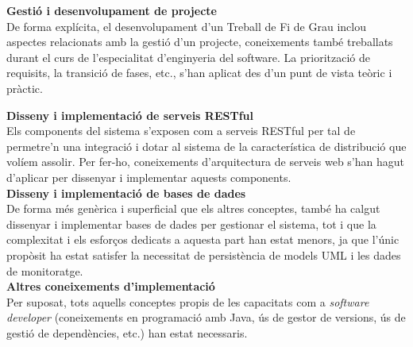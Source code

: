 
\textbf{Gestió i desenvolupament de projecte}\\

De forma explícita, el desenvolupament d'un Treball de Fi de Grau inclou aspectes relacionats amb la gestió d'un projecte, coneixements també treballats durant el curs de l'especialitat d'enginyeria del software. La priorització de requisits, la transició de fases, etc., s'han aplicat des d'un punt de vista teòric i pràctic.\\

\pagebreak

\textbf{Disseny i implementació de serveis RESTful}\\

Els components del sistema s'exposen com a serveis RESTful per tal de permetre'n una integració i dotar al sistema de la característica de distribució que volíem assolir. Per fer-ho, coneixements d'arquitectura de serveis web s'han hagut d'aplicar per dissenyar i implementar aquests components.\\

\textbf{Disseny i implementació de bases de dades}\\

De forma més genèrica i superficial que els altres conceptes, també ha calgut dissenyar i implementar bases de dades per gestionar el sistema, tot i que la complexitat i els esforços dedicats a aquesta part han estat menors, ja que l'únic propòsit ha estat satisfer la necessitat de persistència de models UML i les dades de monitoratge.\\

\textbf{Altres coneixements d'implementació}\\

Per suposat, tots aquells conceptes propis de les capacitats com a \textit{software developer} (coneixements en programació amb Java, ús de gestor de versions, ús de gestió de dependències, etc.) han estat necessaris.
